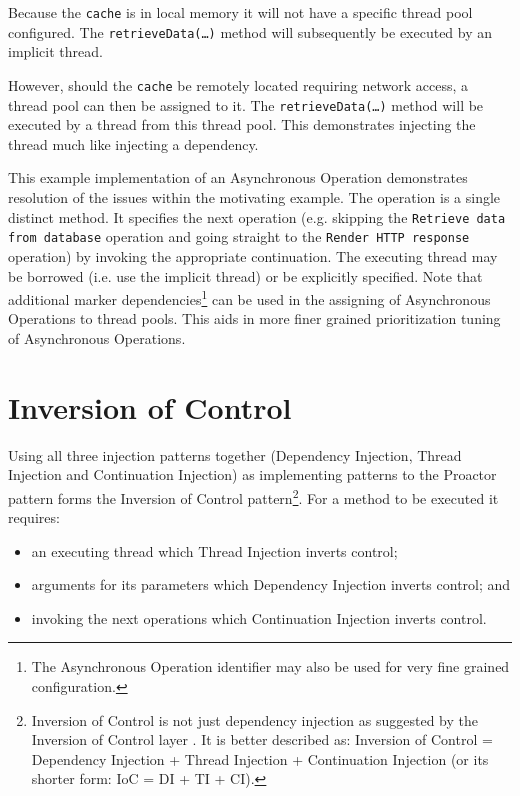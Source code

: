 \documentclass[prodmode]{style/acmlarge}
\begin{document}
Because the \texttt{cache} is in local memory it will not have a specific thread
pool configured.  The \texttt{retrieveData(\ldots)} method will subsequently be
executed by an implicit thread.

However, should the \texttt{cache} be remotely located requiring network access,
a thread pool can then be assigned to it.  The \texttt{retrieveData(\ldots)}
method will be executed by a thread from this thread pool.  This demonstrates
injecting the thread much like injecting a dependency.

This example implementation of an Asynchronous Operation demonstrates resolution
of the issues within the motivating example.  The operation is a single distinct
method.  It specifies the next operation (e.g. skipping the \texttt{Retrieve
data from database} operation and going straight to the \texttt{Render HTTP
response} operation) by invoking the appropriate continuation.  The executing
thread may be borrowed (i.e. use the implicit thread) or be explicitly
specified.  Note that additional marker dependencies\footnote{The Asynchronous
Operation identifier may also be used for very fine grained configuration.} can
be used in the assigning of Asynchronous Operations to thread pools.  This aids
in more finer grained prioritization tuning of Asynchronous Operations.


\section{Inversion of Control}

Using all three injection patterns together (Dependency Injection, Thread
Injection and Continuation Injection) as implementing patterns to the Proactor
pattern forms the Inversion of Control pattern\footnote{Inversion of Control is
not just dependency injection as suggested by the Inversion of Control layer
\cite{ioc}.  It is better described as: Inversion of Control = Dependency
Injection + Thread Injection + Continuation Injection (or its shorter form: IoC
= DI + TI + CI).}.  For a method to be executed it requires:

\begin{itemize}
  \item an executing thread which Thread Injection inverts control;
  \item arguments for its parameters which Dependency Injection inverts control; and
  \item invoking the next operations which Continuation Injection inverts control.
\end{itemize}
\end{document}
